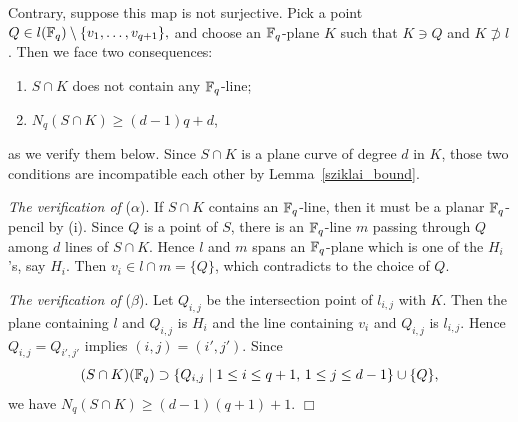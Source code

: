 \documentclass[a4paper,11pt]{article}
\newcommand{\qed}{\hfill \mbox{$  \Box $}}
\begin{document}
Contrary, suppose this map is not surjective.
Pick a point $Q \in l({\Bbb F}_q) \setminus \{ v_1, \dots , v_{q+1} \},$
and choose an ${\Bbb F}_q$-plane $K$ such that $K \ni Q$
and $ K \not\supset l$.
Then we face two consequences:
\begin{enumerate}
\item[($\alpha$)] $S \cap K$ does not contain any ${\Bbb F}_q$-line;
\item[($\beta$)] $N_q(S \cap K) \geq (d-1)q +d$,
\end{enumerate}
as we verify them below.
Since $S \cap K$ is a plane curve of degree $d$ in $K$,
those two conditions are incompatible each other
by Lemma~\ref{sziklai_bound}.

{\em The verification of} ($\alpha$).
If $S \cap K$ contains an ${\Bbb F}_q$-line,
then it must be a planar ${\Bbb F}_q$-pencil by (i).
Since $Q$ is a point of $S$, there is an ${\Bbb F}_q$-line
$m$ passing through $Q$ among $d$ lines of $S \cap K$.
Hence $l$ and $m$ spans an ${\Bbb F}_q$-plane
which is one of the $H_i$'s, say $H_i$.
Then $v_i \in l \cap m =\{ Q \}$,
which contradicts to the choice of $Q$.

{\em The verification of} ($\beta$).
Let $Q_{i,j}$ be the intersection point of $l_{i,j}$ with $K$.
Then the plane containing $l$ and $Q_{i,j}$ is $H_i$
and the line containing $v_i$ and $Q_{i,j}$ is $l_{i,j}$.
Hence $Q_{i,j} =Q_{i',j'}$
implies $(i,j) = (i',j')$.
Since
\[
(S\cap K)({\Bbb F}_q) \supset 
  \{Q_{i,j} \mid 1 \leq i \leq q+1, \, 1 \leq j \leq d-1 \} \cup \{Q\},
\]
we have $N_q(S\cap K) \geq (d-1)(q+1) +1.$
\qed
\end{document}
